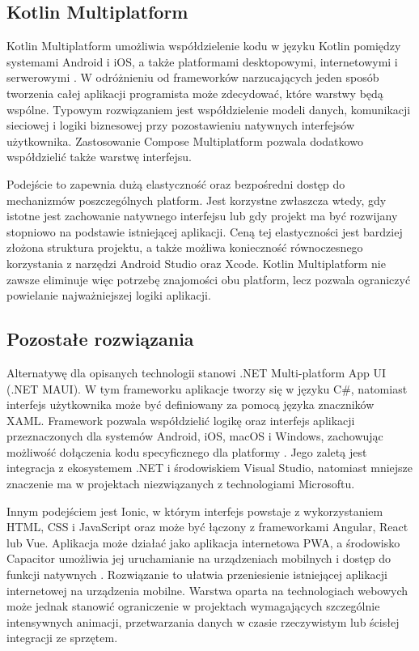 \subsection{Kotlin Multiplatform}
Kotlin Multiplatform umożliwia współdzielenie kodu w języku Kotlin pomiędzy systemami Android i iOS, a także platformami desktopowymi, internetowymi i serwerowymi \cite{kotlinMultiplatform2026}. W odróżnieniu od frameworków narzucających jeden sposób tworzenia całej aplikacji programista może zdecydować, które warstwy będą wspólne. Typowym rozwiązaniem jest współdzielenie modeli danych, komunikacji sieciowej i logiki biznesowej przy pozostawieniu natywnych interfejsów użytkownika. Zastosowanie Compose Multiplatform pozwala dodatkowo współdzielić także warstwę interfejsu.

Podejście to zapewnia dużą elastyczność oraz bezpośredni dostęp do mechanizmów poszczególnych platform. Jest korzystne zwłaszcza wtedy, gdy istotne jest zachowanie natywnego interfejsu lub gdy projekt ma być rozwijany stopniowo na podstawie istniejącej aplikacji. Ceną tej elastyczności jest bardziej złożona struktura projektu, a także możliwa konieczność równoczesnego korzystania z narzędzi Android Studio oraz Xcode. Kotlin Multiplatform nie zawsze eliminuje więc potrzebę znajomości obu platform, lecz pozwala ograniczyć powielanie najważniejszej logiki aplikacji.

\subsection{Pozostałe rozwiązania}
Alternatywę dla opisanych technologii stanowi .NET Multi-platform App UI (.NET MAUI). W tym frameworku aplikacje tworzy się w języku C\#, natomiast interfejs użytkownika może być definiowany za pomocą języka znaczników XAML. Framework pozwala współdzielić logikę oraz interfejs aplikacji przeznaczonych dla systemów Android, iOS, macOS i Windows, zachowując możliwość dołączenia kodu specyficznego dla platformy \cite{dotnetMaui2026}. Jego zaletą jest integracja z ekosystemem .NET i środowiskiem Visual Studio, natomiast mniejsze znaczenie ma w projektach niezwiązanych z technologiami Microsoftu.

Innym podejściem jest Ionic, w którym interfejs powstaje z wykorzystaniem HTML, CSS i JavaScript oraz może być łączony z frameworkami Angular, React lub Vue. Aplikacja może działać jako aplikacja internetowa PWA, a środowisko Capacitor umożliwia jej uruchamianie na urządzeniach mobilnych i dostęp do funkcji natywnych \cite{ionicDocs2026}. Rozwiązanie to ułatwia przeniesienie istniejącej aplikacji internetowej na urządzenia mobilne. Warstwa oparta na technologiach webowych może jednak stanowić ograniczenie w projektach wymagających szczególnie intensywnych animacji, przetwarzania danych w czasie rzeczywistym lub ścisłej integracji ze sprzętem.
